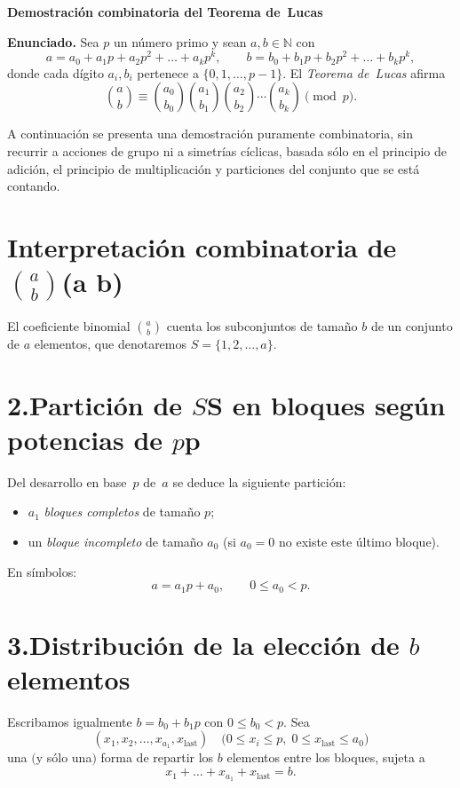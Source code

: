 \documentclass{article}
\begin{document}
\begin{center}
  \Large\bfseries Demostración combinatoria del Teorema de Lucas
\end{center}

\bigskip

\noindent
\textbf{Enunciado.} Sea $p$ un número primo y sean $a,b\in\mathbb N$ con
\[
  a = a_0 + a_1p + a_2p^2 + \dots + a_kp^k,
  \qquad
  b = b_0 + b_1p + b_2p^2 + \dots + b_kp^k,
\]
donde cada dígito $a_i,b_i$ pertenece a $\{0,1,\dots,p-1\}$.  
El \emph{Teorema de Lucas} afirma
\[
  \binom{a}{b}
  \equiv
  \binom{a_0}{b_0}\binom{a_1}{b_1}\binom{a_2}{b_2}\cdots\binom{a_k}{b_k}
  \pmod{p}.
\]

A continuación se presenta una demostración puramente combinatoria,
sin recurrir a acciones de grupo ni a simetrías cíclicas, basada sólo en
el principio de adición, el principio de multiplicación y particiones
del conjunto que se está contando.

\section*{Interpretación combinatoria de {$\binom{a}{b}$}{(a b)}}

El coeficiente binomial $\binom{a}{b}$ cuenta los subconjuntos de tamaño
$b$ de un conjunto de $a$ elementos, que denotaremos
$S=\{1,2,\dots,a\}$.

\section*{2.\;Partición de {$S$}{S} en bloques según potencias de
{$p$}{p}}

Del desarrollo en base $p$ de $a$ se deduce la siguiente partición:

\begin{itemize}
  \item $a_1$ \emph{bloques completos} de tamaño $p$;
  \item un \emph{bloque incompleto} de tamaño $a_0$ (si $a_0=0$
        no existe este último bloque).
\end{itemize}

En símbolos:
\[
  a = a_1p + a_0, \qquad 0\le a_0 < p .
\]

\section*{3.\;Distribución de la elección de $b$ elementos}

Escribamos igualmente
$b = b_0 + b_1p$ con $0\le b_0<p$.
Sea
\[
  (x_1,x_2,\dots,x_{a_1},x_{\text{last}})
\quad
\bigl(0\le x_i\le p,\;0\le x_{\text{last}}\le a_0\bigr)
\]
una $($y sólo una$)$ forma de repartir los $b$ elementos entre los
bloques, sujeta a
\[
  x_1+\dots +x_{a_1}+x_{\text{last}} = b .
\]
\end{document}
